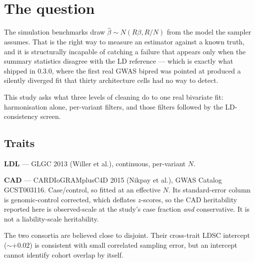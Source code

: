 \section*{The question}

The simulation benchmarks draw $\hat\beta \sim N(R\beta, R/N)$ from the model
the sampler assumes. That is the right way to measure an estimator against a
known truth, and it is structurally incapable of catching a failure that appears
only when the summary statistics disagree with the LD reference --- which is
exactly what shipped in 0.3.0, where the first real GWAS bipred was pointed at
produced a silently diverged fit that thirty architecture cells had no way to
detect.

This study asks what three levels of cleaning do to one real bivariate fit:
harmonisation alone, per-variant filters, and those filters followed by the
LD-consistency screen.

\subsection*{Traits}

\textbf{LDL} --- GLGC 2013 (Willer et al.), continuous, per-variant $N$.

\textbf{CAD} --- CARDIoGRAMplusC4D 2015 (Nikpay et al.), GWAS Catalog
GCST003116. Case/control, so fitted at an effective $N$. Its standard-error
column is genomic-control corrected, which deflates $z$-scores, so the CAD
heritability reported here is observed-scale at the study's case fraction
\emph{and} conservative. It is not a liability-scale heritability.

The two consortia are believed close to disjoint. Their cross-trait LDSC
intercept ($\sim{+}0.02$) is consistent with small correlated sampling error,
but an intercept cannot identify cohort overlap by itself.
